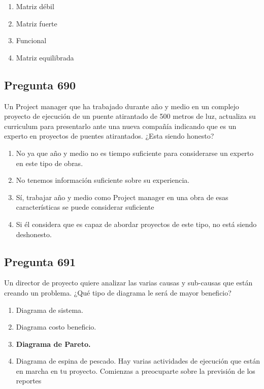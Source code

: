 \documentclass[11pt,a4paper]{article}
\begin{document}
\begin{enumerate}[label=\alph*)]
  \item Matriz débil
  \item Matriz fuerte
  \item Funcional
  \item Matriz equilibrada
\end{enumerate}

\subsection*{Pregunta 690}
Un Project manager que ha trabajado durante año y medio en un complejo proyecto de ejecución de un puente atirantado de 500 metros de luz, actualiza su curriculum para presentarlo ante una nueva compañía indicando que es un experto en proyectos de puentes atirantados. ¿Esta siendo honesto?

\begin{enumerate}[label=\alph*)]
  \item No ya que año y medio no es tiempo suficiente para considerarse un experto en este tipo de obras.
  \item No tenemos información suficiente sobre su experiencia.
  \item Sí, trabajar año y medio como Project manager en una obra de esas características se puede considerar suficiente
  \item Si él considera que es capaz de abordar proyectos de este tipo, no está siendo deshonesto.
\end{enumerate}

\subsection*{Pregunta 691}
Un director de proyecto quiere analizar las varias causas y sub-causas que están creando un problema. ¿Qué tipo de diagrama le será de mayor beneficio?

\begin{enumerate}[label=\alph*)]
  \item Diagrama de sistema.
  \item Diagrama costo beneficio.
  \item \textbf{Diagrama de Pareto.}
  \item Diagrama de espina de pescado. Hay varias actividades de ejecución que están en marcha en tu proyecto. Comienzas a preocuparte sobre la previsión de los reportes
\end{enumerate}
\end{document}

